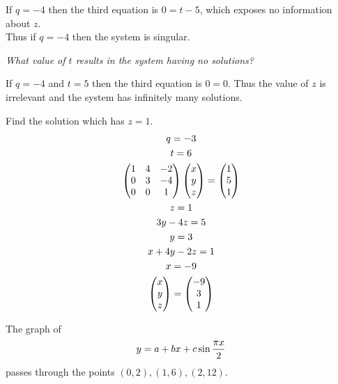 \documentclass{mshw}
\begin{document}
If $q = -4$ then the third equation is $0 = t-5$, which exposes no information about $z$.\\
Thus if $q = -4$ then the system is singular.

\emph{What value of $t$ results in the system having no solutions?}

If $q = -4$ and $t = 5$ then the third equation is $0 = 0$. Thus the value of $z$ is irrelevant and the system has infinitely many solutions.

Find the solution which has $z = 1$.
\begin{gather*}
q = -3 \\ t = 6
\\
\begin{pmatrix}
  1 & 4 & -2 \\
  0 & 3 & -4 \\
  0 & 0 & 1 \\
\end{pmatrix}
\begin{pmatrix} x \\ y \\ z \end{pmatrix}
= \begin{pmatrix} 1 \\ 5 \\ 1 \end{pmatrix}
\\
z = 1 \\
3 y - 4 z = 5 \\
y = 3 \\
x + 4 y - 2 z = 1 \\
x = -9 \\
\begin{pmatrix} x \\ y \\ z \end{pmatrix} = \begin{pmatrix} -9 \\ 3 \\ 1 \end{pmatrix}
\end{gather*}


The graph of
\[ y = a + bx + c\sin\frac{\pi x}{2} \]
passes through the points $(0, 2), (1, 6), (2, 12)$.
\end{document}

